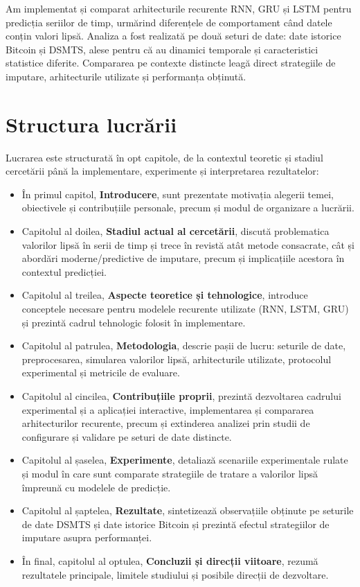 Am implementat și comparat arhitecturile recurente RNN, GRU și LSTM pentru predicția seriilor de timp, urmărind diferențele de comportament când datele conțin valori lipsă. Analiza a fost realizată pe două seturi de date: date istorice Bitcoin și DSMTS, alese pentru că au dinamici temporale și caracteristici statistice diferite. Compararea pe contexte distincte leagă direct strategiile de imputare, arhitecturile utilizate și performanța obținută.

\section{Structura lucrării}

Lucrarea este structurată în opt capitole, de la contextul teoretic și stadiul cercetării până la implementare, experimente și interpretarea rezultatelor:
\begin{itemize}
    \item În primul capitol, \textbf{Introducere}, sunt prezentate motivația alegerii temei, obiectivele și contribuțiile personale, precum și modul de organizare a lucrării.
    \item Capitolul al doilea, \textbf{Stadiul actual al cercetării}, discută problematica valorilor lipsă în serii de timp și trece în revistă atât metode consacrate, cât și abordări moderne/predictive de imputare, precum și implicațiile acestora în contextul predicției.
    \item Capitolul al treilea, \textbf{Aspecte teoretice și tehnologice}, introduce conceptele necesare pentru modelele recurente utilizate (RNN, LSTM, GRU) și prezintă cadrul tehnologic folosit în implementare.
    \item Capitolul al patrulea, \textbf{Metodologia}, descrie pașii de lucru: seturile de date, preprocesarea, simularea valorilor lipsă, arhitecturile utilizate, protocolul experimental și metricile de evaluare.
    \item Capitolul al cincilea, \textbf{Contribuțiile proprii}, prezintă dezvoltarea cadrului experimental și a aplicației interactive, implementarea și compararea arhitecturilor recurente, precum și extinderea analizei prin studii de configurare și validare pe seturi de date distincte.
    \item Capitolul al șaselea, \textbf{Experimente}, detaliază scenariile experimentale rulate și modul în care sunt comparate strategiile de tratare a valorilor lipsă împreună cu modelele de predicție.
    \item Capitolul al șaptelea, \textbf{Rezultate}, sintetizează observațiile obținute pe seturile de date DSMTS și date istorice Bitcoin și prezintă efectul strategiilor de imputare asupra performanței.
    \item În final, capitolul al optulea, \textbf{Concluzii și direcții viitoare}, rezumă rezultatele principale, limitele studiului și posibile direcții de dezvoltare.
\end{itemize}